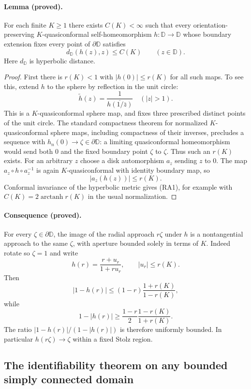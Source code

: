 \documentclass[11pt]{article}
\theoremstyle{definition}\newtheorem{definition}[theorem]{Definition}
\theoremstyle{remark}\newtheorem{remark}[theorem]{Remark}
\begin{document}
\paragraph{Lemma (proved).}
For each finite $K\geq1$ there exists $C(K)<\infty$ such that every
orientation-preserving $K$-quasiconformal self-homeomorphism
$h:\mathbb D\to\mathbb D$ whose boundary extension fixes every point of
$\partial\mathbb D$ satisfies
\[
 d_{\mathbb D}(h(z),z)\leq C(K)\qquad(z\in\mathbb D).
 \tag{RA1}
\]
Here $d_{\mathbb D}$ is hyperbolic distance.

\begin{proof}
First there is $r(K)<1$ with $|h(0)|\leq r(K)$ for all such maps.  To see
this, extend $h$ to the sphere by reflection in the unit circle:
\[
 \widetilde h(z)=\frac1{\overline{h(1/\bar z)}}\quad(|z|>1).
\]
This is a $K$-quasiconformal sphere map, and fixes three prescribed distinct
points of the unit circle.  The standard compactness theorem for normalized
$K$-quasiconformal sphere maps, including compactness of their inverses,
precludes a sequence with $h_n(0)\to\zeta\in\partial\mathbb D$: a limiting
quasiconformal homeomorphism would send both $0$ and the fixed boundary
point $\zeta$ to $\zeta$.  Thus such an $r(K)$ exists.
For an arbitrary $z$ choose a disk automorphism $a_z$ sending $z$ to $0$.
The map $a_z\circ h\circ a_z^{-1}$ is again $K$-quasiconformal with identity
boundary map, so
\[
 |a_z(h(z))|\leq r(K).
\]
Conformal invariance of the hyperbolic metric gives (RA1), for example with
$C(K)=2\operatorname{arctanh}r(K)$ in the usual normalization.
\end{proof}

\paragraph{Consequence (proved).}
For every $\zeta\in\partial\mathbb D$, the image of the radial approach
$r\zeta$ under $h$ is a nontangential approach to the same $\zeta$, with
aperture bounded solely in terms of $K$.
Indeed rotate so $\zeta=1$ and write
\[
 h(r)=\frac{r+u_r}{1+ru_r},\qquad |u_r|\leq r(K).
\]
Then
\[
 |1-h(r)|\leq(1-r)\frac{1+r(K)}{1-r(K)},
\]
while
\[
 1-|h(r)|\geq
 \frac{1-r}{2}\frac{1-r(K)}{1+r(K)}.
\]
The ratio $|1-h(r)|/(1-|h(r)|)$ is therefore uniformly bounded.  In
particular $h(r\zeta)\to\zeta$ within a fixed Stolz region.

\subsection{The identifiability theorem on any bounded simply connected domain}
\end{document}
